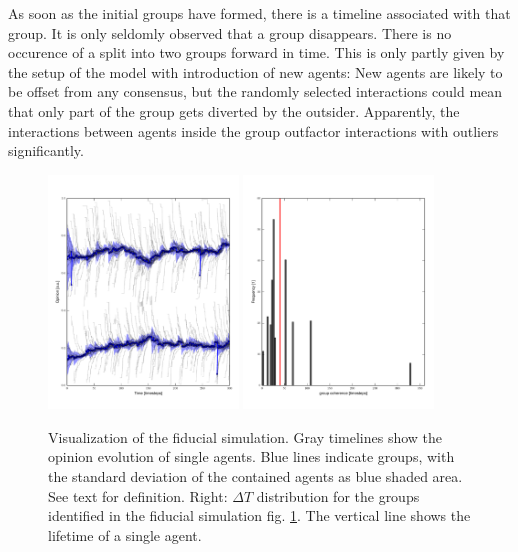\documentclass[useAMS,usenatbib]{mn2e}
\begin{document}
As soon as the initial groups have formed, there is a timeline
associated with that group. It is only seldomly observed that a group
disappears. There is no occurence of a split into two
groups forward in time. This is only partly given by the setup of the model with
introduction of new agents: New agents are likely to be offset from
any consensus, but the randomly selected interactions could mean that
only part of the group gets diverted by the outsider. Apparently, the
interactions between agents inside the group outfactor interactions
with outliers significantly.

\begin{figure}
  \begin{center}
    \includegraphics[width=0.45\textwidth]{fig/fiducial.pdf}
    \includegraphics[width=0.45\textwidth]{fig/fiducial_var.pdf}
  \end{center}
  \caption{\label{fig:fiducial} Visualization of the fiducial
    simulation. Gray timelines show the opinion evolution of single
    agents. Blue lines indicate groups, with the standard deviation of
    the contained agents as blue shaded area. See text for definition.
    Right: $\Delta T$ distribution for the groups
    identified in the fiducial simulation fig. \ref{fig:fiducial}. The
    vertical line shows the lifetime of a single agent.}
\end{figure}
\end{document}
